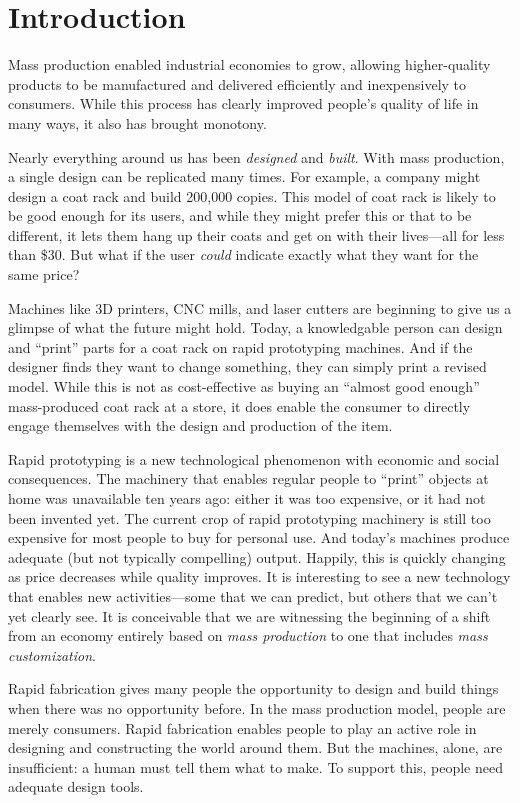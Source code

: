 \chapter{Introduction}

Mass production enabled industrial economies to grow, allowing
higher-quality products to be manufactured and delivered efficiently
and inexpensively to consumers. While this process has clearly
improved people's quality of life in many ways, it also has brought
monotony. 

Nearly everything around us has been \textit{designed} and
\textit{built}. With mass production, a single design can be
replicated many times. For example, a company might design a coat rack
and build 200,000 copies. This model of coat rack is likely to be good
enough for its users, and while they might prefer this or that to be
different, it lets them hang up their coats and get on with their
lives---all for less than \$30. But what if the user \textit{could}
indicate exactly what they want for the same price?

Machines like 3D printers, CNC mills, and laser cutters are beginning
to give us a glimpse of what the future might hold. Today, a
knowledgable person can design and ``print'' parts for a coat rack on
rapid prototyping machines. And if the designer finds they want to
change something, they can simply print a revised model. While this is
not as cost-effective as buying an ``almost good enough''
mass-produced coat rack at a store, it does enable the consumer to
directly engage themselves with the design and production of the item.

Rapid prototyping is a new technological phenomenon with economic and
social consequences. The machinery that enables regular people to
``print'' objects at home was unavailable ten years ago: either it was
too expensive, or it had not been invented yet. The current crop of
rapid prototyping machinery is still too expensive for most people to
buy for personal use. And today's machines produce adequate (but not
typically compelling) output. Happily, this is quickly changing as
price decreases while quality improves. It is interesting to see a new
technology that enables new activities---some that we can predict, but
others that we can't yet clearly see. It is conceivable that we are
witnessing the beginning of a shift from an economy entirely based on
\textit{mass production} to one that includes \textit{mass
  customization}.

Rapid fabrication gives many people the opportunity to design and
build things when there was no opportunity before. In the mass
production model, people are merely consumers. Rapid fabrication
enables people to play an active role in designing and constructing
the world around them. But the machines, alone, are insufficient: a
human must tell them what to make. To support this, people need
adequate design tools.

